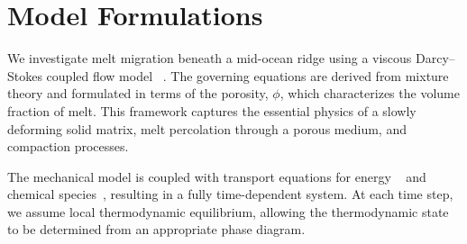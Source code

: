 \section{Model Formulations}
\label{chap:physmodel}
We investigate melt migration beneath a mid-ocean ridge using a viscous Darcy–Stokes coupled flow model
~\cite{ctx23979187210006011, MagmaPhysics, Fowler01031984}. 
The governing equations are derived from mixture theory and formulated in terms of the porosity, 
$\phi$, which characterizes the volume fraction of melt.
This framework captures the essential physics of a slowly deforming solid matrix, melt percolation through 
a porous medium, and compaction processes.

The mechanical model is coupled with transport equations for energy ~\cite{MagmaDynamicsEnthalpyMethod} 
and chemical species~\cite{GeochemicalConsequence}, resulting in a 
fully time-dependent system. At each time step, we assume local thermodynamic equilibrium, allowing the 
thermodynamic state to be determined from an appropriate phase diagram.

